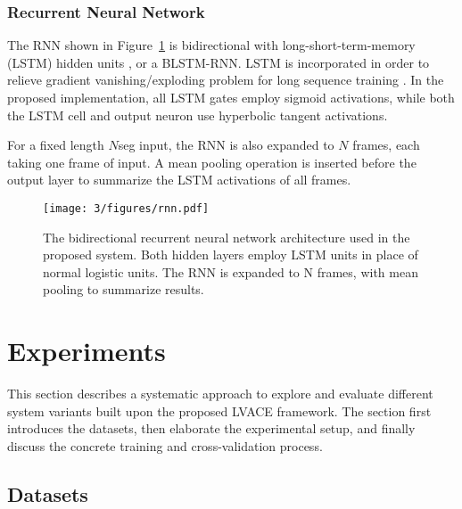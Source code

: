 \subsubsection{Recurrent Neural Network}

The RNN shown in Figure~\ref{fig:3-rnn} is bidirectional with long-short-term-memory (LSTM) hidden units \cite{hochreiter1997long}, or a BLSTM-RNN. LSTM is incorporated in order to relieve gradient vanishing/exploding problem for long sequence training \cite{bengio2009learning}. In the proposed implementation, all LSTM gates employ sigmoid activations, while both the LSTM cell and output neuron use hyperbolic tangent activations.

For a fixed length $N$seg input, the RNN is also expanded to $N$ frames, each taking one frame of input. A mean pooling operation \cite{maas2011learning} is inserted before the output layer to summarize the LSTM activations of all frames.

\begin{figure}[h]
\centering
\texttt{[image: 3/figures/rnn.pdf]}
\caption{The bidirectional recurrent neural network architecture used in the proposed system. Both hidden layers employ LSTM units in place of normal logistic units. The RNN is expanded to N frames, with mean pooling to summarize results.}
\label{fig:3-rnn}
\end{figure}

\section{Experiments} \label{sec:3-exper}
This section describes a systematic approach to explore and evaluate different system variants built upon the proposed LVACE framework. The section first introduces the datasets, then elaborate the experimental setup, and finally discuss the concrete training and cross-validation process.

\subsection{Datasets}


